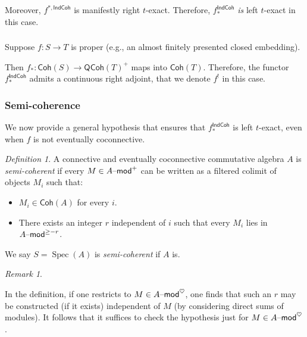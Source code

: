 \documentclass[reqno,11pt]{amsart}
\numberwithin{equation}{subsection}
\theoremstyle{remark}
\newtheorem{rem}[thm]{Remark}
\newtheorem{defin}[thm]{Definition}
\newcommand{\on}{\operatorname}
\newcommand{\mathendash}{\text{\textendash}}
\newcommand{\Spec}{\on{Spec}}
\renewcommand{\mod}{\mathendash\mathsf{mod}}
\newcommand{\heart}{\heartsuit}
\newcommand{\Coh}{\mathsf{Coh}}
\newcommand{\IndCoh}{\mathsf{IndCoh}}
\newcommand{\QCoh}{\mathsf{QCoh}}
\begin{document}
Moreover, $f^{*,\IndCoh}$ is manifestly right $t$-exact. Therefore, 
$f_*^{\IndCoh}$ \emph{is} left $t$-exact in this case. 

\subsubsection{}

Suppose $f:S \to T$ is proper (e.g., an almost finitely presented
closed embedding). 

Then $f_*:\Coh(S) \to \QCoh(T)^+$ maps into $\Coh(T)$. Therefore,
the functor $f_*^{\IndCoh}$ admits a continuous right adjoint, 
that we denote $f^!$ in this case. 

\subsubsection{Semi-coherence}

We now provide a general hypothesis that ensures that $f_*^{\IndCoh}$ is
left $t$-exact, even when $f$ is not eventually coconnective. 

\begin{defin}

A connective and eventually coconnective 
commutative algebra $A$ is \emph{semi-coherent}
if every $M \in A\mod^+$ can be written as a filtered colimit
of objects $M_i$ such that:

\begin{itemize}

\item $M_i \in \Coh(A)$ %
for every $i$.

\item There exists an integer $r$ independent of $i$ 
such that every $M_i$ lies in $A\mod^{\geq -r}$.

\end{itemize}

We say $S = \Spec(A)$ is \emph{semi-coherent} if $A$ is.

\end{defin}

\begin{rem}\label{r:semi-coh-ab}

In the definition, if one restricts to $M \in A\mod^{\heart}$,
one finds that such an $r$ may be constructed (if it exists)
independent of $M$ (by considering direct sums of modules).  
It follows that it suffices to check the hypothesis just for $M \in A\mod^{\heart}$.

\end{rem}
\end{document}
